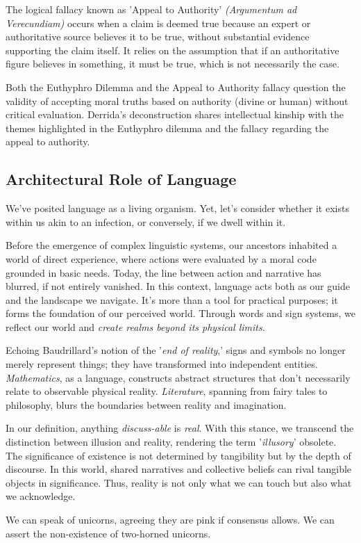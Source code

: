 \documentclass[11pt,a4]{article}
\begin{document}
    \par


    The  logical fallacy known as 'Appeal to Authority' \textit{(Argumentum ad Verecundiam)} occurs when a claim is deemed true because an expert or authoritative source believes it to be true, without substantial evidence supporting the claim itself.  It relies on the assumption that if an authoritative figure believes in something, it must be true, which is not necessarily the case.

    \par

    Both the Euthyphro Dilemma and the Appeal to Authority fallacy question the validity of accepting moral truths based on authority (divine or human) without critical evaluation. Derrida's deconstruction\cite{Deconstruction} shares intellectual kinship with the themes highlighted in the Euthyphro dilemma and the fallacy regarding the appeal to authority.


\subsection{Architectural Role of Language}
        We've posited language as a living organism. Yet, let's consider whether it exists within us akin to an infection, or conversely, if we dwell within it.
        \par
        Before the emergence of complex linguistic systems, our ancestors inhabited a world of direct experience, where actions were evaluated by a moral code grounded in basic needs. Today, the line between action and narrative has blurred, if not entirely vanished. In this context, language acts both as our guide and the landscape we navigate. It's more than a tool for practical purposes; it forms the foundation of our perceived world. Through words and sign systems, we reflect our world and \textit{create realms beyond its physical limits}.

        \par
        Echoing Baudrillard's notion of the '\textit{end of reality},' signs and symbols no longer merely represent things; they have transformed into independent entities.
        \textit{Mathematics}, as a language, constructs abstract structures that don't necessarily relate to observable physical reality. \textit{Literature}, spanning from fairy tales to philosophy, blurs the boundaries between reality and imagination.

        \par
        In our definition, anything\textit{ discuss-able} is \textit{real}. With this stance, we transcend the distinction between illusion and reality, rendering the term '\textit{illusory}' obsolete. The significance of existence is not determined by tangibility but by the depth of discourse. In this world, shared narratives and collective beliefs can rival tangible objects in significance. Thus, reality is not only what we can touch but also what we acknowledge.
        \par
        We can speak of unicorns, agreeing they are pink if consensus allows. We can assert the non-existence of two-horned unicorns.
\end{document}

